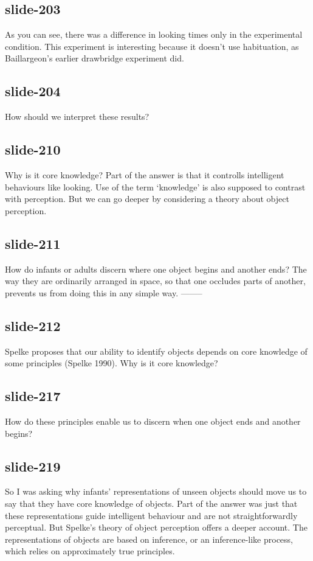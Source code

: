\documentclass[12pt,\papersize]{extarticle}
\begin{document}
 
\subsection{slide-203}
As you can see, there was a difference in looking times only in the experimental condition.
This experiment is interesting because it doesn't use habituation, as Baillargeon's earlier drawbridge experiment did.
 
 
\subsection{slide-204}
How should we interpret these results?
 
 
\subsection{slide-210}
Why is it core knowledge?
Part of the answer is that it controlls intelligent behaviours like looking.
Use of the term ‘knowledge’ is also supposed to contrast with perception.
But we can go deeper by considering a theory about object perception.
 
 
\subsection{slide-211}
How do infants or adults discern where one object begins and another ends?
The way they are ordinarily arranged in space, so that one occludes parts of another, prevents us from doing this in any simple way.
--------
 
 
\subsection{slide-212}
Spelke proposes that our ability to identify objects depends on core knowledge of some principles (Spelke 1990).
Why is it core knowledge?
 
 
\subsection{slide-217}
How do these principles enable us to discern when one object ends and another begins?
 
 
\subsection{slide-219}

So I was asking why infants' representations of unseen objects should move us to say that they have core knowledge of objects.
Part of the answer was just that these representations guide intelligent behaviour and are not straightforwardly perceptual.
But Spelke's theory of object perception offers a deeper account.
The representations of objects are based on inference, or an inference-like process, which relies on approximately true principles.
 
 
 

 






\end{document}
